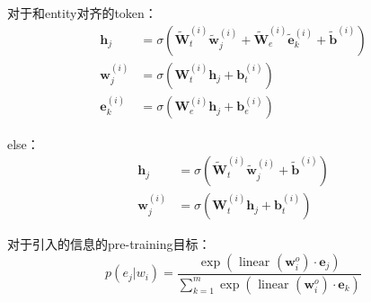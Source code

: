 \documentclass[a4paper,UTF8]{article}
\numberwithin{equation}{section}
\begin{document}
对于和entity对齐的token：
\begin{equation}
\begin{aligned} \boldsymbol{h}_{j} &=\sigma\left(\tilde{\boldsymbol{W}}_{t}^{(i)} \tilde{\boldsymbol{w}}_{j}^{(i)}+\tilde{\boldsymbol{W}}_{e}^{(i)} \tilde{\boldsymbol{e}}_{k}^{(i)}+\tilde{\boldsymbol{b}}^{(i)}\right) \\ \boldsymbol{w}_{j}^{(i)} &=\sigma\left(\boldsymbol{W}_{t}^{(i)} \boldsymbol{h}_{j}+\boldsymbol{b}_{t}^{(i)}\right) \\ \boldsymbol{e}_{k}^{(i)} &=\sigma\left(\boldsymbol{W}_{e}^{(i)} \boldsymbol{h}_{j}+\boldsymbol{b}_{e}^{(i)}\right) \end{aligned}
\end{equation}

else：
\begin{equation}
\begin{aligned} \boldsymbol{h}_{j} &=\sigma\left(\tilde{\boldsymbol{W}}_{t}^{(i)} \tilde{\boldsymbol{w}}_{j}^{(i)}+\tilde{\boldsymbol{b}}^{(i)}\right) \\ \boldsymbol{w}_{j}^{(i)} &=\sigma\left(\boldsymbol{W}_{t}^{(i)} \boldsymbol{h}_{j}+\boldsymbol{b}_{t}^{(i)}\right) \end{aligned}
\end{equation}

对于引入的信息的pre-training目标：
\begin{equation}
	p\left(e_{j} | w_{i}\right)=\frac{\exp \left(\text { linear }\left(\boldsymbol{w}_{i}^{o}\right) \cdot \boldsymbol{e}_{j}\right)}{\sum_{k=1}^{m} \exp \left(\text { linear }\left(\boldsymbol{w}_{i}^{o}\right) \cdot \boldsymbol{e}_{k}\right)}
	\end{equation}
\end{document}

